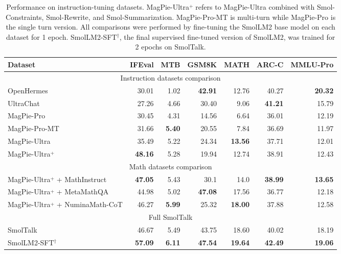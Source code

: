 \begin{table}[h]
\caption{Performance on instruction-tuning datasets. MagPie-Ultra$\overset{+}{}$ refers to MagPie-Ultra combined with Smol-Constraints, Smol-Rewrite, and Smol-Summarization. MagPie-Pro-MT is multi-turn while MagPie-Pro is the single turn version. 
All comparisons were performed by fine-tuning the SmolLM2 base model on each dataset for 1 epoch. SmolLM2-SFT$^\dagger$, the final supervised fine-tuned version of SmolLM2, was trained for 2 epochs on SmolTalk.
}
\label{tab:instruction-tuning-ablations}
\centering
\begin{tabular}{l r r r r r r}
\toprule
\textbf{Dataset} & \textbf{IFEval} & \textbf{MTB} 
                 & \textbf{GSM8K}  & \textbf{MATH} & \textbf{ARC-C} & \textbf{MMLU-Pro} \\
\midrule
\multicolumn{7}{c}{Instruction datasets comparison}\\
\cmidrule{1-7}
OpenHermes                    & 30.01 & 1.02 & \textbf{42.91}  & 12.76 & 40.27 & \textbf{20.32} \\
UltraChat                     & 27.26 & 4.66 & 30.40 & 9.06 & \textbf{41.21} & 15.79 \\
MagPie-Pro                    & 30.45 & 4.31 & 14.56 & 6.64 & 36.01 & 12.19  \\
MagPie-Pro-MT                    & 31.66 & \textbf{5.40} & 20.55 & 7.84 & 36.69 & 11.97 \\
MagPie-Ultra                & 35.49 & 5.22 & 24.34 & \textbf{13.56} & 37.71 & 12.01  \\
MagPie-Ultra$\overset{+}{}$                & \textbf{48.16} & 5.28 & 19.94 & 12.74 & 38.91 & 12.43 \\
\midrule  
\multicolumn{7}{c}{Math datasets comparison} \\
\cmidrule{1-7}
MagPie-Ultra$\overset{+}{}$ 
 + MathInstruct               & \textbf{47.05} & 5.43 & 30.1 & 14.0 & \textbf{38.99} & \textbf{13.65}  \\
MagPie-Ultra$\overset{+}{}$ 
 + MetaMathQA                  & 44.98 & 5.02 & \textbf{47.08} & 17.56 & 36.77 & 12.18 \\
MagPie-Ultra$\overset{+}{}$ 
 + NuminaMath-CoT                  & 46.27 & \textbf{5.99} & 25.32 & \textbf{18.00} & 37.88 & 12.58 \\
\midrule
\multicolumn{7}{c}{Full SmolTalk}\\
\cmidrule{1-7}
SmolTalk  & 46.67 & 5.49 & 43.75 & 18.60 & 40.02 & 18.19 \\
SmolLM2-SFT$^\dagger$  & \textbf{57.09} & \textbf{6.11} & \textbf{47.54} & \textbf{19.64} & \textbf{42.49} & \textbf{19.06} \\
\bottomrule
\end{tabular}
\end{table}

